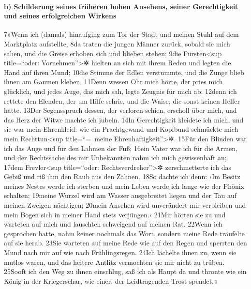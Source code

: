 \hypertarget{b-schilderung-seines-fruxfcheren-hohen-ansehens-seiner-gerechtigkeit-und-seines-erfolgreichen-wirkens}{%
\paragraph{b) Schilderung seines früheren hohen Ansehens, seiner
Gerechtigkeit und seines erfolgreichen
Wirkens}\label{b-schilderung-seines-fruxfcheren-hohen-ansehens-seiner-gerechtigkeit-und-seines-erfolgreichen-wirkens}}

7»Wenn ich (damals) hinaufging zum Tor der Stadt und meinen Stuhl auf
dem Marktplatz aufstellte, 8da traten die jungen Männer zurück, sobald
sie mich sahen, und die Greise erhoben sich und blieben stehen; 9die
Fürsten\textless sup title=``oder: Vornehmen''\textgreater✲ hielten an
sich mit ihrem Reden und legten die Hand auf ihren Mund; 10die Stimme
der Edlen verstummte, und die Zunge blieb ihnen am Gaumen kleben. 11Denn
wessen Ohr mich hörte, der pries mich glücklich, und jedes Auge, das
mich sah, legte Zeugnis für mich ab; 12denn ich rettete den Elenden, der
um Hilfe schrie, und die Waise, die sonst keinen Helfer hatte. 13Der
Segensspruch dessen, der verloren schien, erscholl über mich, und das
Herz der Witwe machte ich jubeln. 14In Gerechtigkeit kleidete ich mich,
und sie war mein Ehrenkleid: wie ein Prachtgewand und Kopfbund schmückte
mich mein Rechttun\textless sup title=``=~meine
Ehrenhaftigkeit''\textgreater✲. 15Für den Blinden war ich das Auge und
für den Lahmen der Fuß; 16ein Vater war ich für die Armen, und der
Rechtssache des mir Unbekannten nahm ich mich gewissenhaft an; 17dem
Frevler\textless sup title=``oder: Rechtsverdreher''\textgreater✲
zerschmetterte ich das Gebiß und riß ihm den Raub aus den Zähnen. 18So
dachte ich denn: ›Im Besitz meines Nestes werde ich sterben und mein
Leben werde ich lange wie der Phönix erhalten; 19meine Wurzel wird am
Wasser ausgebreitet liegen und der Tau auf meinen Zweigen nächtigen;
20mein Ansehen wird unverändert mir verbleiben und mein Bogen sich in
meiner Hand stets verjüngen.‹ 21Mir hörten sie zu und warteten auf mich
und lauschten schweigend auf meinen Rat. 22Wenn ich gesprochen hatte,
nahm keiner nochmals das Wort, sondern meine Rede träufelte auf sie
herab. 23Sie warteten auf meine Rede wie auf den Regen und sperrten den
Mund nach mir auf wie nach Frühlingsregen. 24Ich lächelte ihnen zu, wenn
sie mutlos waren, und das heitere Antlitz vermochten sie mir nicht zu
trüben. 25Sooft ich den Weg zu ihnen einschlug, saß ich als Haupt da und
thronte wie ein König in der Kriegerschar, wie einer, der Leidtragenden
Trost spendet.«

